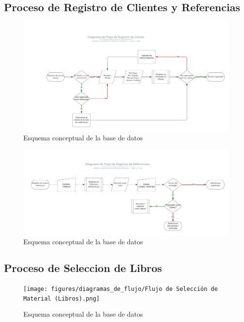 \documentclass[runningheads]{llncs}
\begin{document}
\subsection*{Proceso de Registro de Clientes y Referencias}
\begin{figure}[H]
	\centering\captionsetup{width=0.8\textwidth}
	\includegraphics[width=1\textwidth]{figures/diagramas_de_flujo/Flujo de Registro de Cliente.png}
	\caption{Esquema conceptual de la base de datos} \label{fig2}
\end{figure}
\begin{figure}[H]
	\centering\captionsetup{width=0.8\textwidth}
	\includegraphics[width=1\textwidth]{figures/diagramas_de_flujo/Flujo de Registro de Referencias.png}
	\caption{Esquema conceptual de la base de datos} \label{fig3}
\end{figure}
\subsection*{Proceso de Seleccion de Libros}
\begin{figure}[H]
	\centering\captionsetup{width=0.8\textwidth}
	\texttt{[image: figures/diagramas\_de\_flujo/Flujo de Selección de Material (Libros).png]}
	\caption{Esquema conceptual de la base de datos} \label{fig4}
\end{figure}
\end{document}
